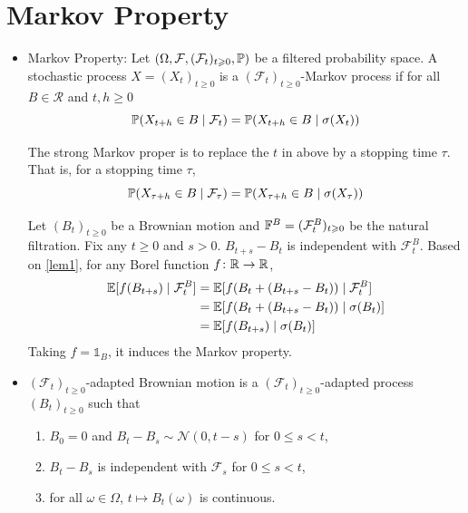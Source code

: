 \documentclass[a4paper,12pt]{article}
\begin{document}
\section{Markov Property}
\begin{itemize}
  \item Markov Property: Let $(\Omega, \mathcal{F}, (\mathcal{F}_t)_{t\geqslant 0}, \mathbb{P})$ be a filtered probability space. A stochastic process $X=(X_t)_{t\geqslant 0}$ is a $(\mathcal{F}_t)_{t\geqslant 0}$-Markov process if for all $B \in \mathcal{R}$ and $t,h \geqslant 0$
  \begin{equation*}
    \mathbb{P}(X_{t+h}\in B \mid \mathcal{F}_t) = \mathbb{P}(X_{t+h}\in B \mid \sigma(X_t))
  \end{equation*}
  \begin{rmk}
    The strong Markov proper is to replace the $t$ in above by a stopping time $\tau$. That is, for a stopping time $\tau$,
    \begin{equation*}
    \mathbb{P}(X_{\tau+h}\in B \mid \mathcal{F}_{\tau}) = \mathbb{P}(X_{\tau+h}\in B \mid \sigma(X_{\tau}))
  \end{equation*}
  \end{rmk}

  \begin{exam}
    Let $(B_t)_{t\geqslant 0}$ be a Brownian motion and $\mathbb{F}^B = (\mathcal{F}^B_t)_{t\geqslant 0}$ be the natural filtration. Fix any $t \geqslant 0$ and $s > 0$. $B_{t+s}-B_t$ is independent with $\mathcal{F}_t^B$. Based on \ref{lem1}, for any Borel function $f \colon \mathbb{R} \rightarrow \mathbb{R}$,
    \begin{equation*}
      \begin{split}
        \mathbb{E}[f(B_{t+s}) \mid \mathcal{F}_t^B] &= \mathbb{E}[f(B_t+(B_{t+s}-B_t)) \mid \mathcal{F}_t^B] \\
        &= \mathbb{E}[f(B_t+(B_{t+s}-B_t)) \mid \sigma(B_t)] \\
        &= \mathbb{E}[f(B_{t+s}) \mid \sigma(B_t)]
      \end{split}
    \end{equation*}
    Taking $f = \mathds{1}_B$, it induces the Markov property.
  \end{exam}

  \item $(\mathcal{F}_t)_{t\geqslant 0}$-adapted Brownian motion is a $(\mathcal{F}_t)_{t\geqslant 0}$-adapted process $(B_t)_{t\geqslant 0}$ such that
  \begin{enumerate}[label=(\arabic*)]
    \item $B_0 = 0$ and $B_t - B_s \sim \mathcal{N}(0,t-s)$ for $0 \leqslant s < t$,
    \item $B_t-B_s$ is independent with $\mathcal{F}_s$ for $0 \leqslant s < t$,
    \item for all $\omega \in \Omega$, $t \mapsto B_t(\omega)$ is continuous.
  \end{enumerate}


\end{itemize}
\end{document}
